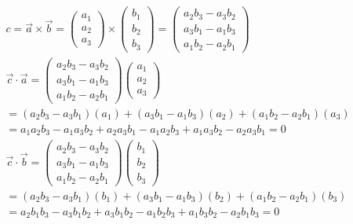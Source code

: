 \documentclass[a4paper]{article}
\begin{document}
  \subsection{}
    \begin{align*}
      c = \vec{a} \times \vec{b}
      =
      \begin{pmatrix}
      a_1 \\ a_2 \\ a_3
      \end{pmatrix}
      \times
      \begin{pmatrix}
      b_1 \\ b_2 \\ b_3
      \end{pmatrix}
      =
      \begin{pmatrix}
      a_2 b_3 - a_3 b_2 \\ a_3 b_1 - a_1 b_3 \\ a_1 b_2 - a_2 b_1
      \end{pmatrix}
      \\[1em]
      \vec{c} \cdot \vec{a}
      =
      \begin{pmatrix}
      a_2 b_3 - a_3 b_2 \\ a_3 b_1 - a_1 b_3 \\ a_1 b_2 - a_2 b_1
      \end{pmatrix}
      \begin{pmatrix}
      a_1 \\ a_2 \\ a_3
      \end{pmatrix}
      \\[1em]
      = (a_2 b_3 - a_3 b_1) (a_1) + (a_3 b_1 - a_1 b_3) (a_2) + (a_1 b_2 - a_2 b_1) (a_3)
      \\[1em]
      = a_1 a_2 b_3 - a_1 a_3 b_2 + a_2 a_3 b_1 - a_1 a_2 b_3 + a_1 a_3 b_2 - a_2 a_3 b_1
      = 0
      \\[1em]
      \vec{c} \cdot \vec{b}
      =
      \begin{pmatrix}
      a_2 b_3 - a_3 b_2 \\ a_3 b_1 - a_1 b_3 \\ a_1 b_2 - a_2 b_1
      \end{pmatrix}
      \begin{pmatrix}
      b_1 \\ b_2 \\ b_3
      \end{pmatrix}
      \\[1em]
      = (a_2 b_3 - a_3 b_1) (b_1) + (a_3 b_1 - a_1 b_3) (b_2) + (a_1 b_2 - a_2 b_1) (b_3)
      \\[1em]
      = a_2 b_1 b_3 - a_3 b_1 b_2 + a_3 b_1 b_2 - a_1 b_2 b_3 + a_1 b_3 b_2 - a_2 b_1 b_3
      = 0
    \end{align*}
\end{document}
